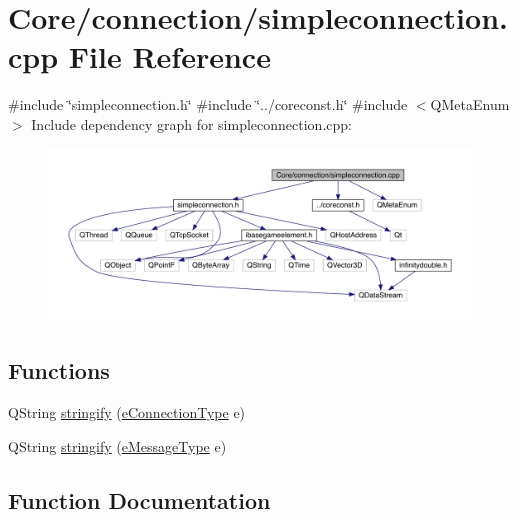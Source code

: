 \hypertarget{a00005}{}\section{Core/connection/simpleconnection.cpp File Reference}
\label{a00005}
{\ttfamily \#include \char`\"{}simpleconnection.\+h\char`\"{}}\newline
{\ttfamily \#include \char`\"{}../coreconst.\+h\char`\"{}}\newline
{\ttfamily \#include $<$Q\+Meta\+Enum$>$}\newline
Include dependency graph for simpleconnection.\+cpp\+:
\nopagebreak
\begin{figure}[H]
\begin{center}
\leavevmode
\includegraphics[width=350pt]{de/d21/a00006}
\end{center}
\end{figure}
\subsection*{Functions}
\begin{DoxyCompactItemize}
\item 
Q\+String \hyperlink{a00005_aabd3ff178ce3faed55804cc56f78fc6a}{stringify} (\hyperlink{a00008_ab66d8802c50493de7d50e181d6f8e296}{e\+Connection\+Type} e)
\item 
Q\+String \hyperlink{a00005_abb3e44449c2fd1fa9275c1d4273c66f9}{stringify} (\hyperlink{a00008_a700ed30d49bfe436323e17539d3a0010}{e\+Message\+Type} e)
\end{DoxyCompactItemize}


\subsection{Function Documentation}
\mbox{\label{a00005_aabd3ff178ce3faed55804cc56f78fc6a}} 
